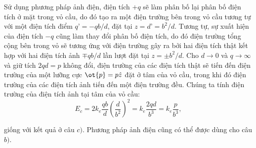 \begin{loigiai}
\begin{enumerate}[1)]
Sử dụng phương pháp ảnh điện, điện tích $+q$ sẽ làm phân bố lại phân bố điện tích ở mặt trong vỏ cầu, do đó tạo ra một điện trường bên trong vỏ cầu tương tự với một điện tích điểm $q’ = -qb/d$, đặt tại $z= d’ = b^2/d$. Tương tự, sự xuất hiện của điện tích $-q$ cũng làm thay đổi phân bố điện tích, do đó điện trường tổng cộng bên trong vỏ sẽ tương ứng với điện trường gây ra bởi hai điện tích thật kết hợp với hai điện tích ảnh $\mp qb/d$ lần lượt đặt tại $z= \pm b^2/d$. Cho $d \rightarrow 0$ và $q \rightarrow \infty$ và giữ tích $2qd= p$ không đổi, điện trường của các điện tích thật sẽ tiến đến điện trường của một lưỡng cực $\ot{p} = p\hat{{z}}$ đặt ở tâm của vỏ cầu, trong khi đó điện trường của các điện tích ảnh tiến đến một điện trường đều. Chúng ta tính điện trường của điện tích ảnh tại tâm của vỏ cầu:
    \[E_c = 2 k_e \frac{qb}{d}\left(\frac{d}{b^2}\right)^2 = k_e \frac{2qd}{b^3} = k_e \frac{p}{b^3} , \tag{8}\]

giống với kết quả ở câu $c)$. Phương pháp ảnh điện cũng có thể được dùng cho câu $b)$.
\end{enumerate}
\end{loigiai}

